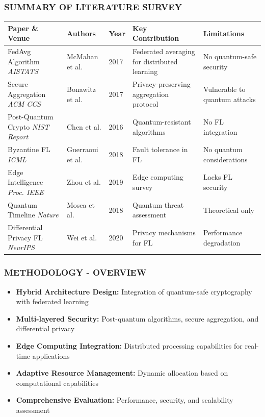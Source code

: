 \documentclass[aspectratio=169]{beamer}
\begin{document}
\begin{frame}
    \frametitle{SUMMARY OF LITERATURE SURVEY}
    \scriptsize
    \begin{tabular}{|p{3cm}|p{2cm}|p{1.8cm}|p{4cm}|p{2.5cm}|}
        \hline
        \textbf{Paper \& Venue} & \textbf{Authors} & \textbf{Year} & \textbf{Key Contribution} & \textbf{Limitations} \\
        \hline
        [1] FedAvg Algorithm \newline \textit{AISTATS} & McMahan et al. & 2017 & Federated averaging for distributed learning & No quantum-safe security \\
        \hline
        [2] Secure Aggregation \newline \textit{ACM CCS} & Bonawitz et al. & 2017 & Privacy-preserving aggregation protocol & Vulnerable to quantum attacks \\
        \hline
        [3] Post-Quantum Crypto \newline \textit{NIST Report} & Chen et al. & 2016 & Quantum-resistant algorithms & No FL integration \\
        \hline
        [4] Byzantine FL \newline \textit{ICML} & Guerraoui et al. & 2018 & Fault tolerance in FL & No quantum considerations \\
        \hline
        [5] Edge Intelligence \newline \textit{Proc. IEEE} & Zhou et al. & 2019 & Edge computing survey & Lacks FL security \\
        \hline
        [6] Quantum Timeline \newline \textit{Nature} & Mosca et al. & 2018 & Quantum threat assessment & Theoretical only \\
        \hline
        [7] Differential Privacy FL \newline \textit{NeurIPS} & Wei et al. & 2020 & Privacy mechanisms for FL & Performance degradation \\
        \hline
    \end{tabular}
\end{frame}

\begin{frame}
    \frametitle{METHODOLOGY - OVERVIEW}
    \begin{itemize}
        \item \textbf{Hybrid Architecture Design:} Integration of quantum-safe cryptography with federated learning
        \item \textbf{Multi-layered Security:} Post-quantum algorithms, secure aggregation, and differential privacy
        \item \textbf{Edge Computing Integration:} Distributed processing capabilities for real-time applications
        \item \textbf{Adaptive Resource Management:} Dynamic allocation based on computational capabilities
        \item \textbf{Comprehensive Evaluation:} Performance, security, and scalability assessment
    \end{itemize}
\end{frame}
\end{document}
